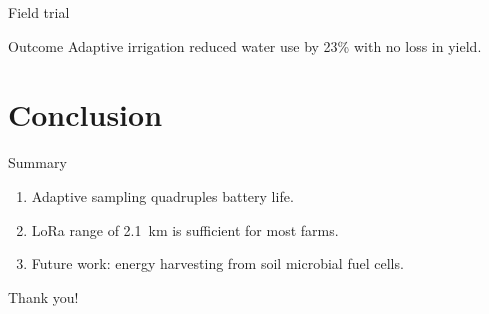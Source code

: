 \documentclass[aspectratio=169]{beamer}
\begin{document}
\begin{frame}{Field trial}
  \begin{exampleblock}{Outcome}
    Adaptive irrigation reduced water use by 23\% with no loss in yield.
  \end{exampleblock}
\end{frame}

\section{Conclusion}
\begin{frame}{Summary}
  \begin{enumerate}
    \item Adaptive sampling quadruples battery life.
    \item LoRa range of 2.1~km is sufficient for most farms.
    \item Future work: energy harvesting from soil microbial fuel cells.
  \end{enumerate}
  \vfill
  \centering\Large Thank you!
\end{frame}
\end{document}
